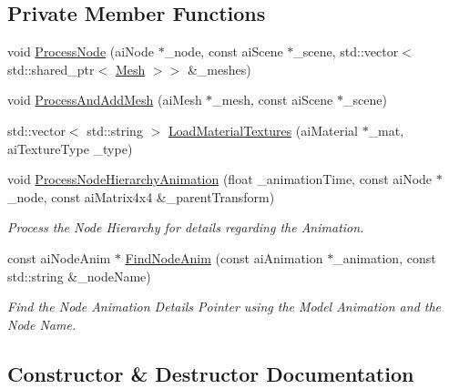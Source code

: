 \subsection*{Private Member Functions}
\begin{DoxyCompactItemize}
\item 
void \mbox{\hyperlink{classpiolot_1_1_object_ace45406ebc032ac05e6b9bb388ebc3c2}{Process\+Node}} (ai\+Node $\ast$\+\_\+node, const ai\+Scene $\ast$\+\_\+scene, std\+::vector$<$ std\+::shared\+\_\+ptr$<$ \mbox{\hyperlink{classpiolot_1_1_mesh}{Mesh}} $>$$>$ \&\+\_\+meshes)
\item 
void \mbox{\hyperlink{classpiolot_1_1_object_ab917dddc7f767962960e607ada13a4d5}{Process\+And\+Add\+Mesh}} (ai\+Mesh $\ast$\+\_\+mesh, const ai\+Scene $\ast$\+\_\+scene)
\item 
std\+::vector$<$ std\+::string $>$ \mbox{\hyperlink{classpiolot_1_1_object_a87d3fb79aa882718cf10d72f85a397dc}{Load\+Material\+Textures}} (ai\+Material $\ast$\+\_\+mat, ai\+Texture\+Type \+\_\+type)
\item 
void \mbox{\hyperlink{classpiolot_1_1_object_a0fb805f24099b9084e70ec083c25d253}{Process\+Node\+Hierarchy\+Animation}} (float \+\_\+animation\+Time, const ai\+Node $\ast$\+\_\+node, const ai\+Matrix4x4 \&\+\_\+parent\+Transform)
\begin{DoxyCompactList}\small\item\em Process the Node Hierarchy for details regarding the Animation. \end{DoxyCompactList}\item 
const ai\+Node\+Anim $\ast$ \mbox{\hyperlink{classpiolot_1_1_object_a63011b95040a4fab1f2514258c70b35a}{Find\+Node\+Anim}} (const ai\+Animation $\ast$\+\_\+animation, const std\+::string \&\+\_\+node\+Name)
\begin{DoxyCompactList}\small\item\em Find the Node Animation Details Pointer using the Model Animation and the Node Name. \end{DoxyCompactList}\end{DoxyCompactItemize}


\subsection{Constructor \& Destructor Documentation}
\mbox{\label{classpiolot_1_1_object_a05e280baf87f9780e5de1c24849b862c}} 
